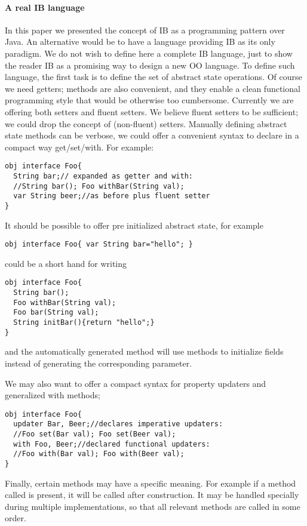 \paragraph{A real IB language}
In this paper we presented the concept of IB as a programming pattern over Java.
An alternative would be to have a language providing IB as its only paradigm.
We do not wish to define here a complete IB language, just to show the reader IB as
a promising way to design a new OO language.
To define such language, the first task is to define the set of abstract state operations.
Of course we need getters; \Q@withX@ methods are also convenient, and they enable a
clean functional programming style that would be otherwise too cumbersome.
Currently we are offering both setters and fluent setters.
We believe fluent setters to be sufficient; we could drop the concept of (non-fluent) setters.
Manually defining abstract state methods can be verbose, we could offer a convenient syntax to
declare in a compact way get/set/with.
For example:
\begin{lstlisting}
obj interface Foo{
  String bar;// expanded as getter and with:
  //String bar(); Foo withBar(String val);
  var String beer;//as before plus fluent setter
}
\end{lstlisting}

\noindent It should be possible to offer pre initialized abstract state, for example
\begin{lstlisting}
obj interface Foo{ var String bar="hello"; }
\end{lstlisting}
\noindent could be a short hand for writing

\begin{lstlisting}
obj interface Foo{
  String bar();
  Foo withBar(String val);
  Foo bar(String val);
  String initBar(){return "hello";}
}
\end{lstlisting}
and the automatically generated \Q@of@ method will use \Q@initX@ methods to initialize fields
instead of generating the corresponding parameter.


We may also want to offer a compact syntax for property updaters and generalized with methods;
\begin{lstlisting}[morekeywords={with}]
obj interface Foo{
  updater Bar, Beer;//declares imperative updaters:
  //Foo set(Bar val); Foo set(Beer val);
  with Foo, Beer;//declared functional updaters:
  //Foo with(Bar val); Foo with(Beer val);
}
\end{lstlisting}
Finally, certain methods may have a specific meaning. For example
if a method called \Q@postInit@ is present, it will be called after construction.
It may be handled specially during multiple implementations, so that all relevant \Q@postInit@ methods are
called in some order.
